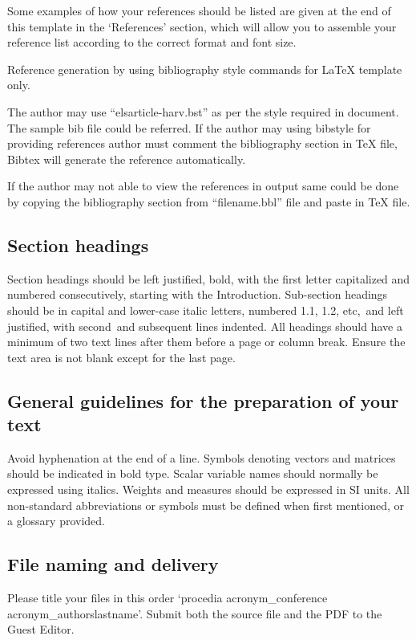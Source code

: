 \documentclass[3p,times,procedia]{elsarticle}
\begin{document}
Some examples of how your references should be listed are given at the end of this template in the `References' section, which will allow you to assemble your reference list according to the correct format and font size.

Reference generation by using bibliography style commands for LaTeX template only.

The author may use ``elsarticle-harv.bst'' as per the style required in document. The sample bib file could be referred. 
If the author may using bibstyle for providing references author must comment the bibliography section in TeX file, Bibtex will generate the reference automatically.

If the author may not able to view the references in output same could be done by copying the bibliography section from ``filename.bbl'' file and paste in TeX file.



\subsection{Section headings}
Section headings should be left justified, bold, with the first letter capitalized and numbered consecutively, starting with the Introduction. Sub-section headings should be in capital and lower-case italic letters, numbered 1.1, 1.2, etc,~and left justified, with second~and subsequent lines indented. All headings should have a minimum of two text lines after them before a page or column break.
Ensure the text area is not blank except for the last page.

\subsection{General guidelines for the preparation of your text}
Avoid hyphenation at the end of a line. Symbols denoting vectors and matrices should be indicated in bold type. Scalar variable names should normally be expressed using italics. Weights and measures should be expressed in SI units. All non-standard abbreviations or symbols must be defined when first mentioned, or a glossary provided.

\subsection{File naming and delivery}
Please title your files in this order `procedia acronym\_conference acronym\_authorslastname'.  Submit both the source file and the PDF to the Guest Editor.
\end{document}

